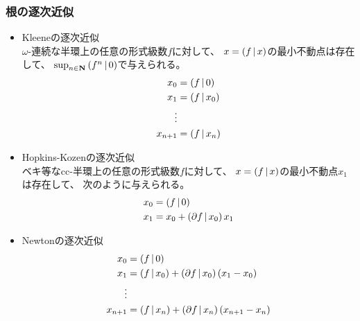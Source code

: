 {\subsubsection{根の逐次近似}\label{s3:根の逐次近似} %
	\begin{itemize}\setlength{\itemsep}{-1mm} %
		\item Kleeneの逐次近似 \\
		$\omega$-連続な半環上の任意の形式級数$f$に対して、
		$x=\mathinner{({f{\,|\,}x})}$の最小不動点は存在して、
		$\sup_{n\in\mathbf{N}}\mathinner{({f^n{\,|\,}0})}$で与えられる。
		\begin{equation*}\begin{split}
			x_0 &= \mathinner{({f{\,|\,}0})} \\
			x_1 &= \mathinner{({f{\,|\,}x_0})} \\
			\vdots \\
			x_{n+1} &= \mathinner{({f{\,|\,}x_n})} \\
		\end{split}\end{equation*}
		\item Hopkins-Kozenの逐次近似 \\
		ベキ等なcc-半環上の任意の形式級数$f$に対して、
		$x=\mathinner{({f{\,|\,}x})}$の最小不動点$x_1$は存在して、
		次のように与えられる。
		\begin{equation*}\begin{split}
			x_0 &= \mathinner{({f{\,|\,}0})} \\
			x_1 &= x_0 + \mathinner{({\partial f{\,|\,}x_0})}x_1 \\
		\end{split}\end{equation*}
		\item Newtonの逐次近似 \\
		\begin{equation*}\begin{split}
			x_0 &= \mathinner{({f{\,|\,}0})} \\
			x_1 &= \mathinner{({f{\,|\,}x_0})} + \mathinner{({\partial f{\,|\,}x_0})}\mathinner{({x_1 - x_0})} \\
			\vdots \\
			x_{n+1} &= \mathinner{({f{\,|\,}x_n})} + \mathinner{({\partial f{\,|\,}x_n})}\mathinner{({x_{n+1} - x_n})} \\
		\end{split}\end{equation*}
	\end{itemize} %

}

